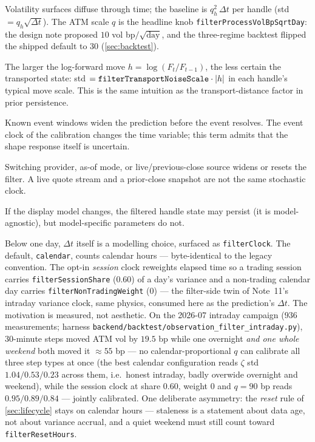 \documentclass[11pt]{article}
\begin{document}
\begin{description}[leftmargin=1.7em,style=nextline]
\item[Clock noise.]
Volatility surfaces diffuse through time; the baseline is
$q_h^2\,\Delta t$ per handle (std $=q_h\sqrt{\Delta t}$). The ATM scale $q$ is
the headline knob \texttt{filterProcessVolBpSqrtDay}: the design note proposed
$10$ vol bp$/\sqrt{\text{day}}$, and the three-regime backtest flipped the
shipped default to $30$ (\cref{sec:backtest}).
\item[Spot transport noise.]
The larger the log-forward move $h=\log(F_t/F_{t-1})$, the less certain the
transported state: std $=\texttt{filterTransportNoiseScale}\cdot\lvert h\rvert$ in
each handle's typical move scale. This is the same intuition as the
transport-distance factor in prior persistence.
\item[Event noise.]
Known event windows widen the prediction before the event resolves. The event
clock of the calibration changes the time variable; this term admits that the
shape response itself is uncertain.
\item[Source noise.]
Switching provider, as-of mode, or live/previous-close source widens or resets
the filter. A live quote stream and a prior-close snapshot are not the same
stochastic clock.
\item[Model noise.]
If the display model changes, the filtered handle state may persist (it is
model-agnostic), but model-specific parameters do not.
\end{description}

Below one day, $\Delta t$ itself is a modelling choice, surfaced as
\texttt{filterClock}. The default, \texttt{calendar}, counts calendar hours
--- byte-identical to the legacy convention. The opt-in \emph{session}
clock reweights elapsed time so a
trading session carries \texttt{filterSessionShare} ($0.60$) of a day's
variance and a non-trading calendar day carries
\texttt{filterNonTradingWeight} ($0$) --- the filter-side twin of Note~11's
intraday variance clock, same physics, consumed here as the prediction's
$\Delta t$. The motivation is measured, not aesthetic. On the 2026-07
intraday campaign ($936$ measurements; harness
\nolinkurl{backend/backtest/observation_filter_intraday.py}), $30$-minute
steps moved ATM vol by $19.5$ bp while one
overnight \emph{and one whole weekend} both moved it $\approx55$ bp --- no
calendar-proportional $q$ can calibrate all three step types at once (the
best calendar configuration reads $\zeta$ std $1.04/0.53/0.23$ across them,
i.e.\ honest intraday, badly overwide overnight and weekend), while the
session clock at share $0.60$, weight $0$ and $q=90$ bp reads
$0.95/0.89/0.84$ --- jointly calibrated. One deliberate asymmetry: the
\emph{reset} rule of \cref{sec:lifecycle} stays on calendar hours ---
staleness is a statement about data age, not about variance accrual, and a
quiet weekend must still count toward \texttt{filterResetHours}.
\end{document}

